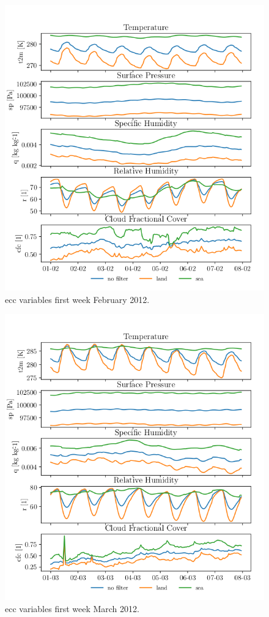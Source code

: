 \begin{figure}[ht]
    \centering
    \includegraphics{python_figs/spatially_averaged_one_week_from_2012-02-01.png}
    \caption{\acrshort{ecc} variables first week February 2012.}
    \label{fig:feb12}
\end{figure}
\begin{figure}[ht]
    \centering
    \includegraphics{python_figs/spatially_averaged_one_week_from_2012-03-01.png}
    \caption{\acrshort{ecc} variables first week March 2012.}
    \label{fig:mar12}
\end{figure}

